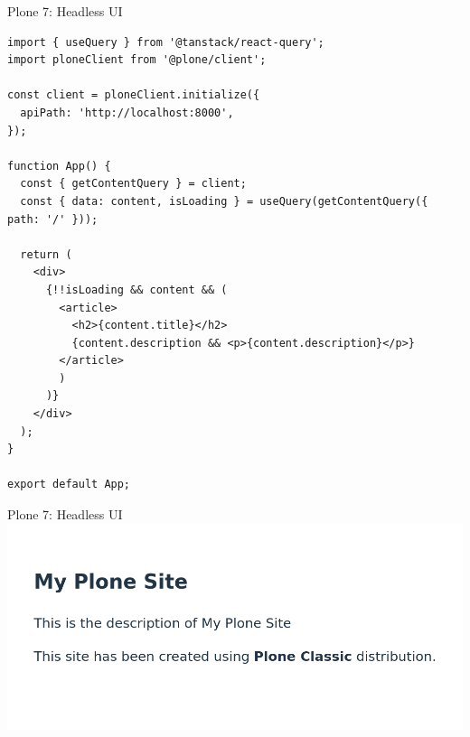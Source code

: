 \documentclass[12pt,aspectratio=169]{beamer}
\begin{document}

\begin{frame}[fragile]{Plone 7: Headless UI}
\tiny
\begin{verbatim}
import { useQuery } from '@tanstack/react-query';
import ploneClient from '@plone/client';

const client = ploneClient.initialize({
  apiPath: 'http://localhost:8000',
});

function App() {
  const { getContentQuery } = client;
  const { data: content, isLoading } = useQuery(getContentQuery({ path: '/' }));

  return (
    <div>
      {!!isLoading && content && (
        <article>
          <h2>{content.title}</h2>
          {content.description && <p>{content.description}</p>}
        </article>
        )
      )}
    </div>
  );
}

export default App;
\end{verbatim}
\end{frame}


\begin{frame}[fragile]{Plone 7: Headless UI}
  \includegraphics[width=0.95\columnwidth]{images/vite.png}
\end{frame}

\end{document}
